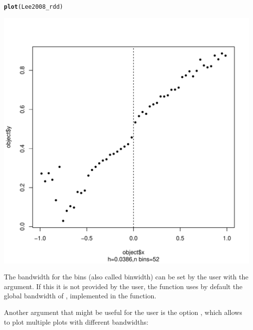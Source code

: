 \documentclass[english,nojss]{jss}\usepackage{graphicx, color}
\makeatletter
\def\maxwidth{ %
  \ifdim\Gin@nat@width>\linewidth
    \linewidth
  \else
    \Gin@nat@width
  \fi
}
\newcommand{\hlfunctioncall}[1]{\textcolor[rgb]{0.501960784313725,0,0.329411764705882}{\textbf{#1}}}%
\newenvironment{kframe}{%
 \def\at@end@of@kframe{}%
 \ifinner\ifhmode%
  \def\at@end@of@kframe{\end{minipage}}%
  \begin{minipage}{\columnwidth}%
 \fi\fi%
 \def\FrameCommand##1{\hskip\@totalleftmargin \hskip-\fboxsep
 \colorbox{shadecolor}{##1}\hskip-\fboxsep
     \hskip-\linewidth \hskip-\@totalleftmargin \hskip\columnwidth}%
 \MakeFramed {\advance\hsize-\width
   \@totalleftmargin\z@ \linewidth\hsize
   \@setminipage}}%
 {\par\unskip\endMakeFramed%
 \at@end@of@kframe}
\newenvironment{knitrout}{}{} %
\makeatother
\begin{document}
\begin{knitrout}
\color{fgcolor}\begin{kframe}
\begin{alltt}
\hlfunctioncall{plot}(Lee2008_rdd)
\end{alltt}
\end{kframe}
\includegraphics[width=\maxwidth]{figure/unnamed-chunk-4} 

\end{knitrout}


The bandwidth for the bins (also called binwidth) can be set by the
user with the  argument. If this it is not provided by the
user, the function uses by default the global bandwidth of \citet{RuppertSheatherEtAl1995},
implemented in the  function. 

Another argument that might be useful for the user is the option ,
which allows to plot multiple plots with different bandwidths:
\end{document}
